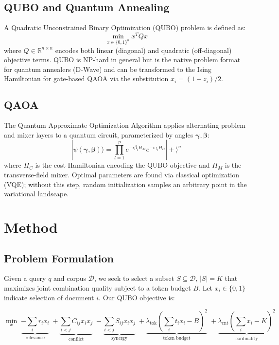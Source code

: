 \documentclass{article}
\begin{document}
\subsection{QUBO and Quantum Annealing}

A Quadratic Unconstrained Binary Optimization (QUBO) problem is defined
as:
\begin{equation}
\min_{x \in \{0,1\}^n} x^T Q x
\end{equation}
where $Q \in \mathbb{R}^{n \times n}$ encodes both linear (diagonal)
and quadratic (off-diagonal) objective terms. QUBO is NP-hard in
general but is the native problem format for quantum annealers
(D-Wave) and can be transformed to the Ising Hamiltonian for gate-based
QAOA via the substitution $x_i = (1 - z_i)/2$.

\subsection{QAOA}

The Quantum Approximate Optimization Algorithm \cite{farhi2014qaoa}
applies alternating problem and mixer layers to a quantum circuit,
parameterized by angles $\boldsymbol{\gamma}, \boldsymbol{\beta}$:
\begin{equation}
|\psi(\boldsymbol{\gamma}, \boldsymbol{\beta})\rangle =
\prod_{l=1}^{p} e^{-i\beta_l H_M} e^{-i\gamma_l H_C} |+\rangle^n
\end{equation}
where $H_C$ is the cost Hamiltonian encoding the QUBO objective and
$H_M$ is the transverse-field mixer. Optimal parameters are found via
classical optimization (VQE); without this step, random initialization
samples an arbitrary point in the variational landscape.

\section{Method}
\label{sec:method}

\subsection{Problem Formulation}

Given a query $q$ and corpus $\mathcal{D}$, we seek to select a subset
$S \subseteq \mathcal{D}$, $|S| = K$ that maximizes joint combination
quality subject to a token budget $B$. Let $x_i \in \{0,1\}$ indicate
selection of document $i$. Our QUBO objective is:

\begin{equation}
\min_{x} \; \underbrace{-\sum_i r_i x_i}_{\text{relevance}} \;
+ \underbrace{\sum_{i < j} C_{ij} x_i x_j}_{\text{conflict}} \;
- \underbrace{\sum_{i < j} S_{ij} x_i x_j}_{\text{synergy}} \;
+ \underbrace{\lambda_{\text{tok}} \left(\sum_i t_i x_i - B\right)^2}_{\text{token budget}} \;
+ \underbrace{\lambda_{\text{cnt}} \left(\sum_i x_i - K\right)^2}_{\text{cardinality}}
\label{eq:qubo}
\end{equation}
\end{document}
